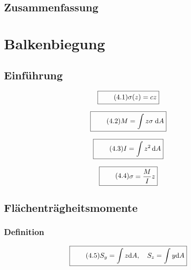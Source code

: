 \documentclass[11pt]{article}
\newcommand{\1}{ {\mathds{1}} }
\newcommand{\td}{\,\text{d}}
\begin{document}
		\subsection{Zusammenfassung}

		\section{Balkenbiegung}
		\subsection{Einführung}

		\begin{equation}
			\boxed{
				\tag{4.1}
				\begin{split}
					\sigma(z) = c z
				\end{split}
			}
		\end{equation}

		\begin{equation}
			\boxed{
				\tag{4.2}
				\begin{split}
					M = \int{z\sigma \; \text{d}A}
				\end{split}
			}
		\end{equation}

				\begin{equation}
			\boxed{
				\tag{4.3}
				\begin{split}
					I = \int z^2 \td A
				\end{split}
			}
		\end{equation}

						\begin{equation}
			\boxed{
				\tag{4.4}
				\begin{split}
					\sigma = \frac{M}{I} z
				\end{split}
			}
		\end{equation}

		\subsection{Flächenträgheitsmomente}
		\subsubsection{Definition}

		\begin{equation}
			\boxed{
				\tag{4.5}
				\begin{split}
					S_y
					=
					\int z \text{d} A, \quad
					S_z
					=
					\int y \text{d} A
				\end{split}
			}
		\end{equation}
\end{document}
